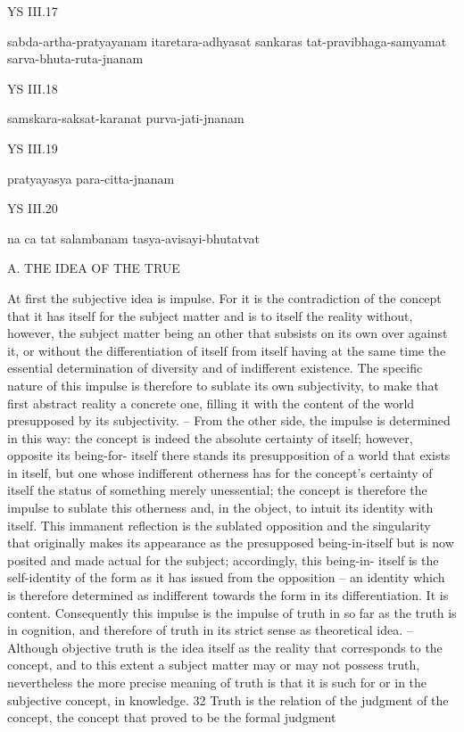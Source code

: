 YS III.17

sabda-artha-pratyayanam itaretara-adhyasat sankaras tat-pravibhaga-samyamat sarva-bhuta-ruta-jnanam

YS III.18

samskara-saksat-karanat purva-jati-jnanam

YS III.19

pratyayasya para-citta-jnanam

YS III.20

na ca tat salambanam tasya-avisayi-bhutatvat

A. THE IDEA OF THE TRUE

At first the subjective idea is impulse. For it is the contradiction of the
concept that it has itself for the subject matter and is to itself the reality
without, however, the subject matter being an other that subsists on its
own over against it, or without the differentiation of itself from itself
having at the same time the essential determination of diversity and of
indifferent existence. The specific nature of this impulse is therefore to
sublate its own subjectivity, to make that first abstract reality a concrete
one, filling it with the content of the world presupposed by its subjectivity. –
From the other side, the impulse is determined in this way: the concept
is indeed the absolute certainty of itself; however, opposite its being-for-
itself there stands its presupposition of a world that exists in itself, but one
whose indifferent otherness has for the concept’s certainty of itself the status
of something merely unessential; the concept is therefore the impulse to
sublate this otherness and, in the object, to intuit its identity with itself.
This immanent reflection is the sublated opposition and the singularity
that originally makes its appearance as the presupposed being-in-itself but
is now posited and made actual for the subject; accordingly, this being-in-
itself is the self-identity of the form as it has issued from the opposition –
an identity which is therefore determined as indifferent towards the form
in its differentiation. It is content.
Consequently this impulse is the impulse of truth in so far as the truth
is in cognition, and therefore of truth in its strict sense as theoretical idea. –
Although objective truth is the idea itself as the reality that corresponds to
the concept, and to this extent a subject matter may or may not possess
truth, nevertheless the more precise meaning of truth is that it is such for
or in the subjective concept, in knowledge. 32 Truth is the relation of the
judgment of the concept, the concept that proved to be the formal judgment
